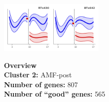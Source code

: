 \begin{multicols}{2}
\includegraphics[width=2in]{figures/clusters/root_Postflowering_1.png}
\columnbreak

\noindent \textbf{Overview}\\\textbf{Cluster 2:} AMF-post \\
\textbf{Number of genes:} 807 \\
\textbf{Number of ``good'' genes:} 565 \\
\end{multicols}

